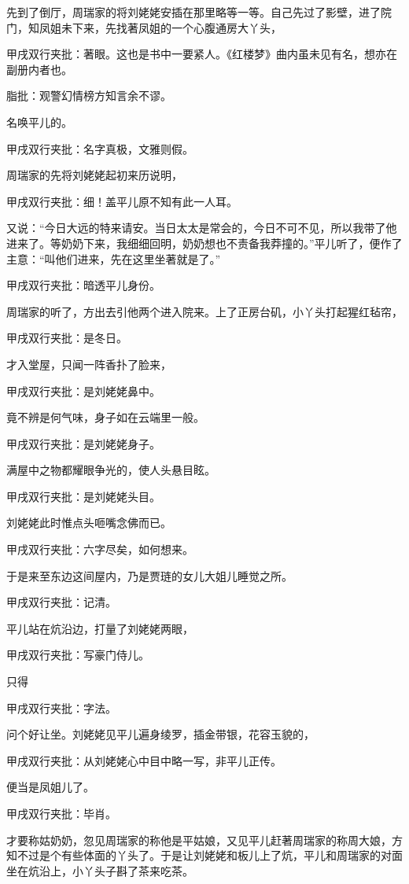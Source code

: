 \begin{parag}

    先到了倒厅，周瑞家的将刘姥姥安插在那里略等一等。自己先过了影壁，进了院门，知凤姐未下来，先找著凤姐的一个心腹通房大丫头，\begin{note}甲戌双行夹批：著眼。这也是书中一要紧人。《红楼梦》曲内虽未见有名，想亦在副册内者也。\end{note}\begin{note}脂批：观警幻情榜方知言余不谬。\end{note}名唤平儿的。\begin{note}甲戌双行夹批：名字真极，文雅则假。\end{note}周瑞家的先将刘姥姥起初来历说明，\begin{note}甲戌双行夹批：细！盖平儿原不知有此一人耳。\end{note}又说：“今日大远的特来请安。当日太太是常会的，今日不可不见，所以我带了他进来了。等奶奶下来，我细细回明，奶奶想也不责备我莽撞的。”平儿听了，便作了主意：“叫他们进来，先在这里坐著就是了。”\begin{note}甲戌双行夹批：暗透平儿身份。\end{note}周瑞家的听了，方出去引他两个进入院来。上了正房台矶，小丫头打起猩红毡帘，\begin{note}甲戌双行夹批：是冬日。\end{note}才入堂屋，只闻一阵香扑了脸来，\begin{note}甲戌双行夹批：是刘姥姥鼻中。 \end{note}竟不辨是何气味，身子如在云端里一般。\begin{note}甲戌双行夹批：是刘姥姥身子。 \end{note}满屋中之物都耀眼争光的，使人头悬目眩。\begin{note}甲戌双行夹批：是刘姥姥头目。\end{note}刘姥姥此时惟点头咂嘴念佛而已。\begin{note}甲戌双行夹批：六字尽矣，如何想来。\end{note}于是来至东边这间屋内，乃是贾琏的女儿大姐儿睡觉之所。\begin{note}甲戌双行夹批：记清。\end{note}平儿站在炕沿边，打量了刘姥姥两眼，\begin{note}甲戌双行夹批：写豪门侍儿。\end{note}只得\begin{note}甲戌双行夹批：字法。\end{note}问个好让坐。刘姥姥见平儿遍身绫罗，插金带银，花容玉貌的，\begin{note}甲戌双行夹批：从刘姥姥心中目中略一写，非平儿正传。 \end{note}便当是凤姐儿了。\begin{note}甲戌双行夹批：毕肖。\end{note}才要称姑奶奶，忽见周瑞家的称他是平姑娘，又见平儿赶著周瑞家的称周大娘，方知不过是个有些体面的丫头了。于是让刘姥姥和板儿上了炕，平儿和周瑞家的对面坐在炕沿上，小丫头子斟了茶来吃茶。
\end{parag}


